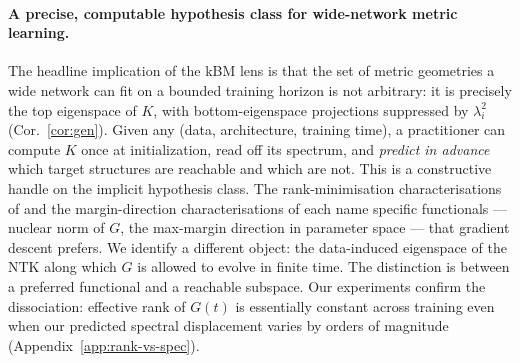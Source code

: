 \documentclass{article}
\begin{document}
\paragraph{A precise, computable hypothesis class for wide-network
metric learning.}
The headline implication of the kBM lens is that the set of metric
geometries a wide network can fit on a bounded training horizon is not
arbitrary: it is precisely the top eigenspace of $K$, with bottom-eigenspace
projections suppressed by $\lambda_i^2$ (Cor.~\ref{cor:gen}). Given any
(data, architecture, training time), a practitioner can compute $K$ once
at initialization, read off its spectrum, and \emph{predict in advance}
which target structures are reachable and which are not. This is a
constructive handle on the implicit hypothesis class. The
rank-minimisation characterisations of
\citet{arora2019implicit,razin2020implicit} and the margin-direction
characterisations of \citet{soudry2018implicit,lyu2019gradient} each
name specific functionals --- nuclear norm of $G$, the max-margin
direction in parameter space --- that gradient descent prefers. We
identify a different object: the data-induced eigenspace of the NTK
along which $G$ is allowed to evolve in finite time. The distinction is
between a preferred functional and a reachable subspace. Our experiments confirm the dissociation:
effective rank of $G(t)$ is essentially constant across training even
when our predicted spectral displacement varies by orders of magnitude
(Appendix~\ref{app:rank-vs-spec}).
\end{document}
